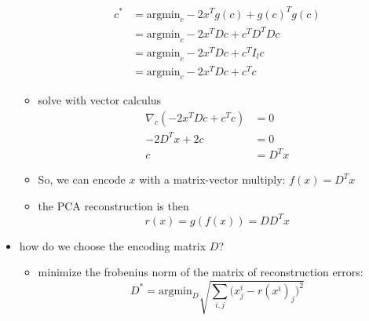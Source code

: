 \begin{itemize}
\begin{itemize}
        \begin{align}
            c^* &= \text{argmin}_c - 2x^Tg(c) + g(c)^Tg(c) \\
            &= \text{argmin}_c -2x^T Dc + c^T D^T Dc \\
            &= \text{argmin}_c -2x^T Dc + c^T I_lc \\
            &= \text{argmin}_c -2x^T Dc + c^Tc 
        \end{align}
        \item solve with vector calculus
        \begin{align}
            \nabla_c (-2x^T Dc + c^T c) &= 0 \\
            -2D^Tx + 2c &= 0 \\
            c &= D^Tx
        \end{align}
        \item So, we can encode $x$ with a matrix-vector multiply: $f(x) = D^Tx$
        \item the PCA reconstruction is then
        $$ r(x) = g(f(x)) = DD^T x$$
    \end{itemize}
    \item how do we choose the encoding matrix $D$?
    \begin{itemize}
        \item minimize the frobenius norm of the matrix of reconstruction errors:
        $$ D^* = \text{argmin}_D \sqrt{\sum_{i,j} \Big( x_j^i - r(x^i)_j \Big)^2} $$
    \end{itemize}
\end{itemize}

